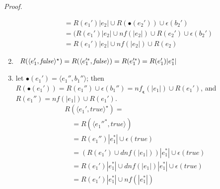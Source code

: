 \documentclass[preprint]{sigplanconf}
\newcommand{\true}{\mathit{true}}
\newcommand{\false}{\mathit{false}}
\newcommand{\varoast}{\star}
\newcommand{\dnf}{\mathit{nf}}
\newcommand{\nf}{\mathit{nf}_{\!\mathbf{\epsilon}}}
\newcounter{item}
\newenvironment{proof}{\begin{trivlist}\item[]{\em Proof.}}{\end{trivlist}}
\begin{document}
\begin{proof}
\begin{enumerate}
\[\begin{array}{l}
\quad = R(e_1')|e_2| \cup R(\bullet(e_2'))\cup \epsilon(b_2')\\
\quad = (R(e_1')|e_2| \cup nf(|e_2|) \cup R(e_2') \cup \epsilon(b_2') \\
\quad = R(e_1')|e_2| \cup nf(|e_2|) \cup R(e_2)
\end{array}
\]
\item 
$
\begin{array}[t]{l}
R(\langle e_1',\false \rangle^\varoast ) =
R(\langle e_1'^*,\false \rangle)
= R(e_1'^*)
= R(e_1')|e_1^*|
\end{array}
$
\item let $\bullet(e_1') = \langle e_1'',b_1''\rangle$; then
$R(\bullet(e_1')) = R(e_1'') \cup \epsilon(b_1'') =
\nf(|e_1|) \cup R(e_1')$, and $R(e_1'') = \dnf(|e_1|) \cup R(e_1')$. 
\[
\begin{array}{l}
R(\langle e_1',true \rangle^\varoast ) =\\
\quad = R(\langle e_1''^*,true \rangle)\\
\quad = R(e_1'')|e_1^*| \cup \epsilon(\true) \\
\quad = (R(e_1') \cup dnf(|e_1|))|e_1^*| \cup \epsilon(\true)\\
\quad = R(e_1')|e_1^*| \cup dnf(|e_1|)|e_1^*| \cup \epsilon(\true)\\
\quad = R(e_1')|e_1^*| \cup nf(|e_1^*|) 
\end{array}
\]
\end{enumerate}
\end{proof}
\end{document}
